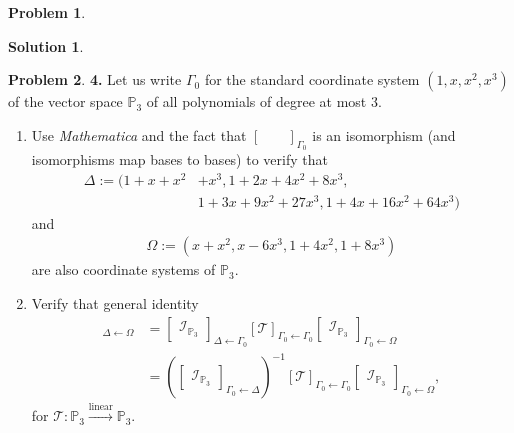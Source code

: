 \documentclass{book}
\theoremstyle{definition}
\newtheorem*{prob*}{Problem}
\newtheorem*{sln*}{Solution}
\begin{document}
\begin{prob*}
\begin{sln*}
\begin{enumerate}
\begin{enumerate}
			\end{enumerate}
			
		\end{enumerate}
	\end{sln*}




\end{prob*}

\newpage














\begin{prob*}\textbf{4.} Let us write $\Gamma_0$ for the standard coordinate system $(1,x,x^2,x^3)$ of the vector space $\mathbb{P}_3$ of all polynomials of degree at most 3. 
	\begin{enumerate}
		\item Use \textit{Mathematica} and the fact that $\begin{bmatrix}\,&\,\end{bmatrix}_{\Gamma_0}$ is an isomorphism (and isomorphisms map bases to bases) to verify that 
		\begin{align*}
		\Delta := (1 + x + x^2 &+ x^3, 1 + 2x+4x^2 + 8x^3,\\
		&1 + 3x+9x^2 + 27x^3, 1+ 4x +16x^2 + 64x^3)
		\end{align*}
		and 
		\begin{align*}
		\Omega := (x+x^2, x-6x^3, 1 + 4x^2, 1+ 8x^3) 
		\end{align*}
		are also coordinate systems of $\mathbb{P}_3$.
	


	\item Verify that general identity
	\begin{align*}
	[\mathcal{T}]_{\Delta \leftarrow \Omega} &= 
	\begin{bmatrix}
	\mathcal{I}_{\mathbb{P}_3}
	\end{bmatrix}_{\Delta \leftarrow \Gamma_0} [\mathcal{T}]_{\Gamma_0 \leftarrow \Gamma_0} 
	\begin{bmatrix}
	\mathcal{I}_{\mathbb{P}_3}
	\end{bmatrix}_{\Gamma_0 \leftarrow \Omega}\\
	&= \left(\begin{bmatrix}
	\mathcal{I}_{\mathbb{P}_3}
	\end{bmatrix}_{\Gamma_0 \leftarrow \Delta}\right)^{-1} [\mathcal{T}]_{\Gamma_0 \leftarrow \Gamma_0} 
	\begin{bmatrix}
	\mathcal{I}_{\mathbb{P}_3}
	\end{bmatrix}_{\Gamma_0 \leftarrow \Omega},
	\end{align*}
	for $\mathcal{T} : \mathbb{P}_3 \overset{\text{linear}}{\longrightarrow} \mathbb{P}_3$.
	

\end{enumerate}
\end{prob*}
\end{document}
